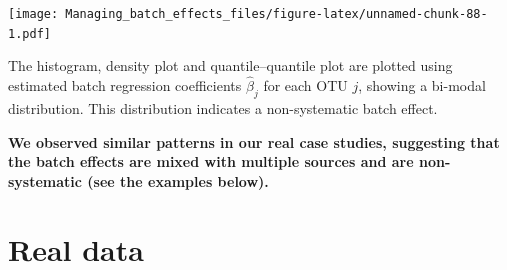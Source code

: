\documentclass[]{book}
\newenvironment{Shaded}{\begin{snugshade}}{\end{snugshade}}
\newcommand{\KeywordTok}[1]{\textcolor[rgb]{0.13,0.29,0.53}{\textbf{#1}}}
\newcommand{\DataTypeTok}[1]{\textcolor[rgb]{0.13,0.29,0.53}{#1}}
\newcommand{\DecValTok}[1]{\textcolor[rgb]{0.00,0.00,0.81}{#1}}
\newcommand{\StringTok}[1]{\textcolor[rgb]{0.31,0.60,0.02}{#1}}
\newcommand{\ControlFlowTok}[1]{\textcolor[rgb]{0.13,0.29,0.53}{\textbf{#1}}}
\newcommand{\OperatorTok}[1]{\textcolor[rgb]{0.81,0.36,0.00}{\textbf{#1}}}
\newcommand{\NormalTok}[1]{#1}
\begin{document}
\begin{Shaded}
\end{Shaded}

\texttt{[image: Managing\_batch\_effects\_files/figure-latex/unnamed-chunk-88-1.pdf]}

The histogram, density plot and quantile--quantile plot are plotted
using estimated batch regression coefficients \(\hat{\beta}_{j}\) for
each OTU \(j\), showing a bi-modal distribution. This distribution
indicates a non-systematic batch effect.

\textbf{We observed similar patterns in our real case studies,
suggesting that the batch effects are mixed with multiple sources and
are non-systematic (see the examples below).}

\section{Real data}\label{real-data}
\end{document}
